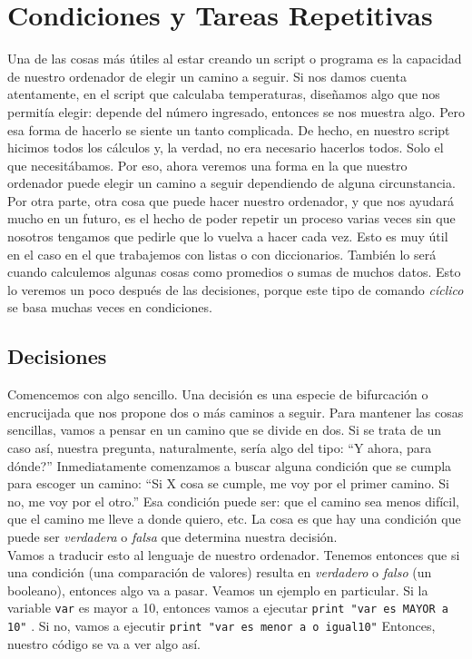 \documentclass[10pt,letterpaper]{article}
\newcommand{\inlinecode}[1]{
\colorbox{light-gray}{\texttt{#1}}
}
\begin{document}
\section{Condiciones y Tareas Repetitivas}
Una de las cosas m\'as \'utiles al estar creando un script o programa es la capacidad de nuestro ordenador de elegir un camino a seguir. Si nos damos cuenta atentamente, en el script que calculaba temperaturas, dise\~namos algo que nos permit\'ia elegir: depende del n\'umero ingresado, entonces se nos muestra algo. Pero esa forma de hacerlo se siente un tanto complicada. De hecho, en nuestro script hicimos todos los c\'alculos y, la verdad, no era necesario hacerlos todos. Solo el que necesit\'abamos. Por eso, ahora veremos una forma en la que nuestro ordenador puede elegir un camino a seguir dependiendo de alguna circunstancia.\\

Por otra parte, otra cosa que puede hacer nuestro ordenador, y que nos ayudar\'a mucho en un futuro, es el hecho de poder repetir un proceso varias veces sin que nosotros tengamos que pedirle que lo vuelva a hacer cada vez. Esto es muy \'util en el caso en el que trabajemos con listas o con diccionarios. Tambi\'en lo ser\'a cuando calculemos algunas cosas como promedios o sumas de muchos datos. Esto lo veremos un poco despu\'es de las decisiones, porque este tipo de comando \emph{c\'iclico} se basa muchas veces en condiciones.

\subsection{Decisiones}
Comencemos con algo sencillo. Una decisi\'on es una especie de bifurcaci\'on o encrucijada que nos propone dos o m\'as caminos a seguir. Para mantener las cosas sencillas, vamos a pensar en un camino que se divide en dos. Si se trata de un caso as\'i, nuestra pregunta, naturalmente, ser\'ia algo del tipo: ``Y ahora, para d\'onde?'' Inmediatamente comenzamos a buscar alguna condici\'on que se cumpla para escoger un camino: ``Si X cosa se cumple, me voy por el primer camino. Si no, me voy por el otro.'' Esa condici\'on puede ser: que el camino sea menos dif\'icil, que el camino me lleve a donde quiero, etc. La cosa es que hay una condici\'on que puede ser \emph{verdadera} o \emph{falsa} que determina nuestra decisi\'on.\\

Vamos a traducir esto al lenguaje de nuestro ordenador. Tenemos entonces que si una condici\'on (una comparaci\'on de valores) resulta en \emph{verdadero} o \emph{falso} (un booleano), entonces algo va a pasar. Veamos un ejemplo en particular. Si la variable \inlinecode{var} es mayor a 10, entonces vamos a ejecutar \inlinecode{print "var es MAYOR a 10"}. Si no, vamos a ejecutir \inlinecode{print "var es menor a  o igual10"} Entonces, nuestro c\'odigo se va a ver algo as\'i.
\end{document}
